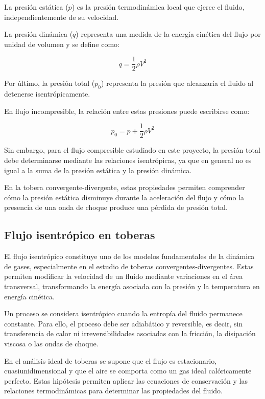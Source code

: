 \documentclass[12pt,letterpaper]{article}
\numberwithin{equation}{section}
\begin{document}
La presión estática ($p$) es la presión
termodinámica local que ejerce el fluido,
independientemente de su velocidad.

La presión dinámica ($q$) representa una
medida de la energía cinética del flujo
por unidad de volumen y se define como:

\begin{equation}
    q=\frac{1}{2}\rho V^2
\end{equation}

Por último, la presión total ($p_0$)
representa la presión que alcanzaría
el fluido al detenerse isentrópicamente.

En flujo incompresible, la relación entre
estas presiones puede escribirse como:

\begin{equation}
    p_0=p+\frac{1}{2}\rho V^2
\end{equation}

Sin embargo, para el flujo compresible
estudiado en este proyecto, la presión
total debe determinarse mediante las
relaciones isentrópicas, ya que en general
no es igual a la suma de la presión
estática y la presión dinámica.

En la tobera convergente-divergente,
estas propiedades permiten comprender
cómo la presión estática disminuye
durante la aceleración del flujo y
cómo la presencia de una onda de choque
produce una pérdida de presión total.


\subsection{Flujo isentrópico en toberas}

El flujo isentrópico constituye uno de los modelos
fundamentales de la dinámica de gases, especialmente
en el estudio de toberas convergentes-divergentes.
Estas permiten modificar la velocidad de un fluido
mediante variaciones en el área transversal,
transformando la energía asociada con la presión
y la temperatura en energía cinética.

Un proceso se considera isentrópico cuando la
entropía del fluido permanece constante. Para
ello, el proceso debe ser adiabático y reversible,
es decir, sin transferencia de calor ni
irreversibilidades asociadas con la fricción,
la disipación viscosa o las ondas de choque.

En el análisis ideal de toberas se supone que
el flujo es estacionario, cuasiunidimensional
y que el aire se comporta como un gas ideal
calóricamente perfecto. Estas hipótesis permiten
aplicar las ecuaciones de conservación y las
relaciones termodinámicas para determinar
las propiedades del fluido.
\end{document}
